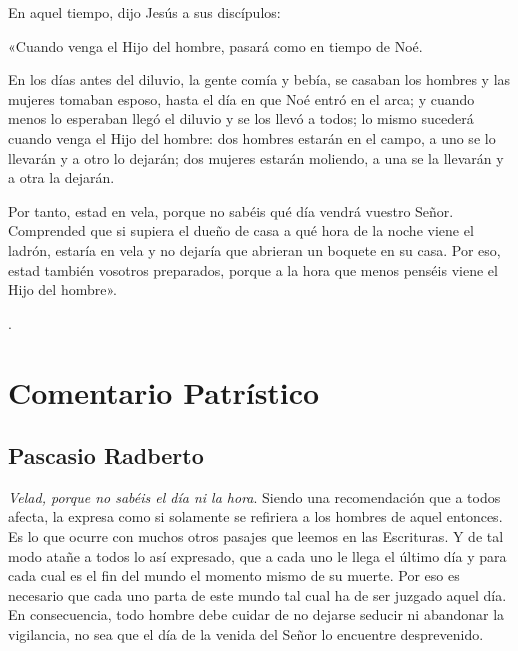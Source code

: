 		\begin{scripture}
			En aquel tiempo, dijo Jesús a sus discípulos:
			
			«Cuando venga el Hijo del hombre, pasará como en tiempo de Noé. 
			
			En los días antes del diluvio, la gente comía y bebía, se casaban los hombres y las mujeres tomaban esposo, hasta el día en que Noé entró en el arca; y cuando menos lo esperaban llegó el diluvio y se los llevó a todos; lo mismo sucederá cuando venga el Hijo del hombre: dos hombres estarán en el campo, a uno se lo llevarán y a otro lo dejarán; dos mujeres estarán moliendo, a una se la llevarán y a otra la dejarán. 
			
			Por tanto, estad en vela, porque no sabéis qué día vendrá vuestro Señor. Comprended que si supiera el dueño de casa a qué hora de la noche viene el ladrón, estaría en vela y no dejaría que abrieran un boquete en su casa. Por eso, estad también vosotros preparados, porque a la hora que menos penséis viene el Hijo del hombre».
		\end{scripture}
.
\newsection

	\section{Comentario Patrístico}
	
		\subsection{Pascasio Radberto}
		
			
			
			\emph{Velad, porque no sabéis el día ni la hora}. Siendo una recomendación que a todos afecta, la expresa como si solamente se refiriera a los hombres de aquel entonces. Es lo que ocurre con muchos otros pasajes que leemos en las Escrituras. Y de tal modo atañe a todos lo así expresado, que a cada uno le llega el último día y para cada cual es el fin del mundo el momento mismo de su muerte. Por eso es necesario que cada uno parta de este mundo tal cual ha de ser juzgado aquel día. En consecuencia, todo hombre debe cuidar de no dejarse seducir ni abandonar la vigilancia, no sea que el día de la venida del Señor lo encuentre desprevenido. 
			

